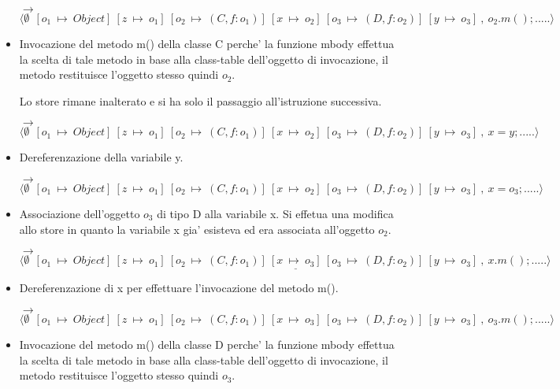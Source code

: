 \begin{itemize}
$\rightarrow$ $\langle\emptyset\:\:[o_1\:\mapsto\:Object]\:[z\:\mapsto\:o_1]\:[o_2\:\mapsto\:(C,f:o_1)]\:[x\:\mapsto\:o_2]\:[o_3\:\mapsto\:(D,f:o_2)]\:[y\:\mapsto\:o_3]\:,\:o_2.m();.....\rangle$

\vspace{0,5cm}
\item Invocazione del metodo m() della classe C perche' la funzione mbody effettua la scelta di tale metodo in base alla class-table dell'oggetto di invocazione, il metodo restituisce l'oggetto stesso quindi $o_2$.

Lo store rimane inalterato e si ha solo il passaggio all'istruzione successiva.

$\rightarrow$ $\langle\emptyset\:\:[o_1\:\mapsto\:Object]\:[z\:\mapsto\:o_1]\:[o_2\:\mapsto\:(C,f:o_1)]\:[x\:\mapsto\:o_2]\:[o_3\:\mapsto\:(D,f:o_2)]\:[y\:\mapsto\:o_3]\:,\:x=y;.....\rangle$

\vspace{0,5cm}
\item Dereferenzazione della variabile y.

$\rightarrow$ $\langle\emptyset\:\:[o_1\:\mapsto\:Object]\:[z\:\mapsto\:o_1]\:[o_2\:\mapsto\:(C,f:o_1)]\:[x\:\mapsto\:o_2]\:[o_3\:\mapsto\:(D,f:o_2)]\:[y\:\mapsto\:o_3]\:,\:x=o_3;.....\rangle$

\vspace{0,5cm}
\item Associazione dell'oggetto $o_3$ di tipo D alla variabile x. Si effetua una modifica allo store in quanto la variabile x gia' esisteva ed era associata all'oggetto $o_2$.

$\rightarrow$ $\langle\emptyset\:\:[o_1\:\mapsto\:Object]\:[z\:\mapsto\:o_1]\:[o_2\:\mapsto\:(C,f:o_1)]\:\underline{[x\:\mapsto\:o_3]}\:[o_3\:\mapsto\:(D,f:o_2)]\:[y\:\mapsto\:o_3]\:,\:x.m();.....\rangle$

\vspace{0,5cm}
\item Dereferenzazione di x per effettuare l'invocazione del metodo m().

$\rightarrow$ $\langle\emptyset\:\:[o_1\:\mapsto\:Object]\:[z\:\mapsto\:o_1]\:[o_2\:\mapsto\:(C,f:o_1)]\:[x\:\mapsto\:o_3]\:[o_3\:\mapsto\:(D,f:o_2)]\:[y\:\mapsto\:o_3]\:,\:o_3.m();.....\rangle$

\vspace{0,5cm}
\item Invocazione del metodo m() della classe D perche' la funzione mbody effettua la scelta di tale metodo in base alla class-table dell'oggetto di invocazione, il metodo restituisce l'oggetto stesso quindi $o_3$.


\end{itemize}
